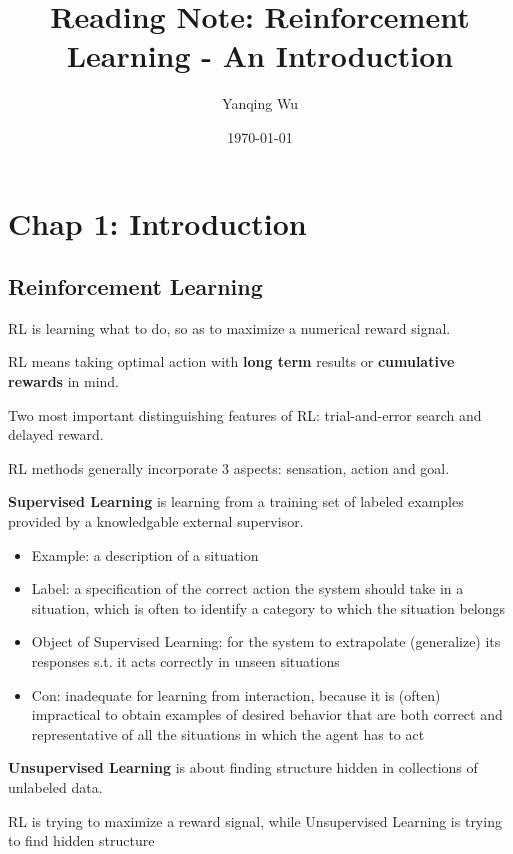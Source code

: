 \documentclass[lang=en,mode=geye,device=normal,color=blue,14pt]{elegantnote}
\title{Reading Note: Reinforcement Learning - An Introduction}
\author{Yanqing Wu}
\institute{Viwistar Robotics}
\date{\today}
\DeclareMathOperator*{\1}{\mathbbm{1}}
\begin{document}
\maketitle

\newpage

\section{Chap 1: Introduction}
\subsection{Reinforcement Learning}

RL is learning what to do, so as to maximize a numerical reward signal.

RL means taking optimal action with \textbf{long term} results or \textbf{cumulative rewards} in mind.

Two most important distinguishing features of RL: trial-and-error search and delayed reward.

RL methods generally incorporate 3 aspects: sensation, action and goal.

\begin{definition}
\textbf{Supervised Learning} is learning from a training set of labeled examples provided by a knowledgable external supervisor.
\end{definition}

\begin{itemize}
	\item Example: a description of a situation
	\item Label: a specification of the correct action the system should take in a situation, which is often to identify a category to which the situation belongs
	\item Object of Supervised Learning: for the system to extrapolate (generalize) its responses s.t. it acts correctly in unseen situations
	\item Con: inadequate for learning from interaction, because it is (often) impractical to obtain examples of desired behavior that are both correct and representative of all the situations in which the agent has to act
\end{itemize}

\begin{definition}
\textbf{Unsupervised Learning} is about finding structure hidden in collections of unlabeled data.
\end{definition}
RL is trying to maximize a reward signal, while Unsupervised Learning is trying to find hidden structure
\end{document}
